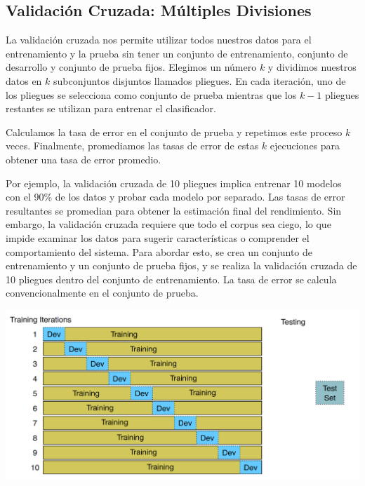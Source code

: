 \documentclass[11pt,fleqn]{book} %
\begin{document}
\subsection{Validación Cruzada: Múltiples Divisiones}

La validación cruzada nos permite utilizar todos nuestros datos para el entrenamiento y la prueba sin tener un conjunto de entrenamiento, conjunto de desarrollo y conjunto de prueba fijos.  Elegimos un número $k$ y dividimos nuestros datos en $k$ subconjuntos disjuntos llamados pliegues.  En cada iteración, uno de los pliegues se selecciona como conjunto de prueba mientras que los $k-1$ pliegues restantes se utilizan para entrenar el clasificador.

Calculamos la tasa de error en el conjunto de prueba y repetimos este proceso $k$ veces.  Finalmente, promediamos las tasas de error de estas $k$ ejecuciones para obtener una tasa de error promedio.

Por ejemplo, la validación cruzada de 10 pliegues implica entrenar 10 modelos con el 90\% de los datos y probar cada modelo por separado.  Las tasas de error resultantes se promedian para obtener la estimación final del rendimiento. Sin embargo, la validación cruzada requiere que todo el corpus sea ciego, lo que impide examinar los datos para sugerir características o comprender el comportamiento del sistema.  Para abordar esto, se crea un conjunto de entrenamiento y un conjunto de prueba fijos, y se realiza la validación cruzada de 10 pliegues dentro del conjunto de entrenamiento.  La tasa de error se calcula convencionalmente en el conjunto de prueba.


\begin{center}
\includegraphics[scale=0.28]{pics/cv.png}
\end{center}
\end{document}
